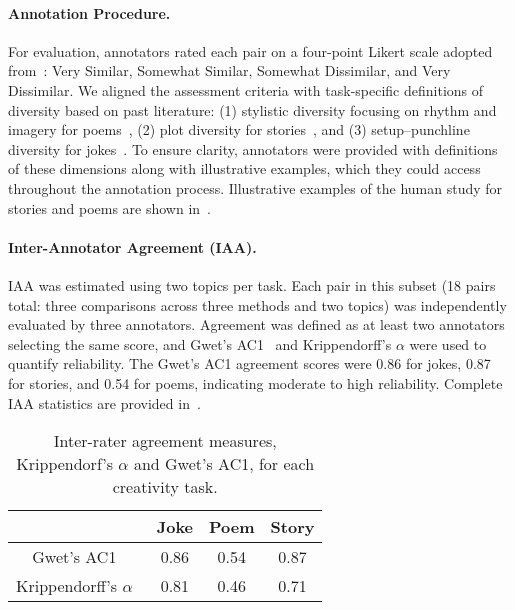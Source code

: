 \paragraph{Annotation Procedure.}
For evaluation, annotators rated each pair on a four-point Likert scale adopted from~\citep{chen-etal-2022-semeval}: Very Similar, Somewhat Similar, Somewhat Dissimilar, and Very Dissimilar. We aligned the assessment criteria with task-specific definitions of diversity based on past literature: (1) stylistic diversity focusing on rhythm and imagery for poems~\citep{chen-etal-2024-evaluating-diversity}, (2) plot diversity for stories~\citep{Xu_2025}, and (3) setup–punchline diversity for jokes~\citep{kim2025aihumorgenerationcognitive}. To ensure clarity, annotators were provided with definitions of these dimensions along with illustrative examples, which they could access throughout the annotation process. 
Illustrative examples of the human study for stories and poems are shown in~.

\paragraph{Inter-Annotator Agreement (IAA).} 
IAA was estimated using two topics per task. Each pair in this subset (18 pairs total: three comparisons across three methods and two topics) was independently evaluated by three annotators. Agreement was defined as at least two annotators selecting the same score, and Gwet's AC1~\citep{gwet2008computing} and Krippendorff's $\alpha$ were used to quantify reliability. The Gwet's AC1 agreement scores were 0.86 for jokes, 0.87 for stories, and 0.54 for poems, indicating moderate to high reliability. Complete IAA statistics are provided in~.

\begin{table}[h]
    \centering
    \caption{Inter-rater agreement measures, Krippendorf's $\alpha$ and Gwet’s AC1, for each creativity task.}
    \label{tab:human_study_IAA}
    \begin{tabular}{cccc}
        \toprule
         & Joke & Poem & Story \\
        \midrule
        Gwet's AC1~\citep{gwet2008computing} & 0.86 & 0.54 & 0.87 \\
        \midrule
        Krippendorff's $\alpha$~\citep{krippendorff2018content}  & 0.81 & 0.46 & 0.71 \\
        \bottomrule
    \end{tabular}
\end{table}





